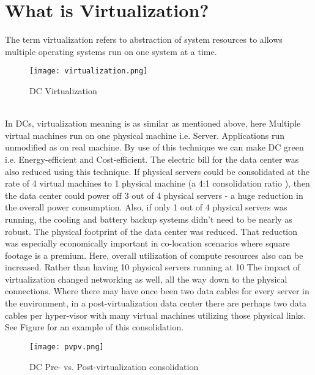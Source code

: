 \documentclass[12pt,a4paper]{report}
\begin{document}
\section{What is Virtualization?}
The term virtualization refers to abstraction of system resources to allows multiple operating systems run on one system at a time.\\
\begin{figure}[h]
\begin{center}
\texttt{[image: virtualization.png]}
\caption{DC Virtualization}
\end{center}
\end{figure}\\
In DCs, virtualization meaning is as similar as mentioned above, here Multiple virtual machines run on one physical machine i.e. Server. Applications run unmodified as on real machine. By use of this technique we can make DC green i.e. Energy-efficient and Cost-efficient. The electric bill for the data center was also reduced using this technique. If physical servers could be consolidated at the rate of 4 virtual machines to 1 physical machine (a 4:1 consolidation ratio ), then the data center could power off 3 out of 4 physical servers - a huge reduction in the overall power consumption. Also, if only 1 out of 4 physical servers was running, the cooling and battery backup systems didn't need to be nearly as robust. The physical footprint of the data center was reduced. That reduction was especially economically important in co-location scenarios where square footage is a premium. Here,  overall utilization of compute resources also can be increased. Rather than having 10 physical servers running at 10%
The impact of virtualization changed networking as well, all the way down to the physical connections. Where there may have once been two data cables for every server in the environment, in a post-virtualization data center there are perhaps two data cables per hyper-visor with many virtual machines utilizing those physical links. See Figure for an example of this consolidation.\\
\begin{figure}[h]
\begin{center}
\texttt{[image: pvpv.png]}
\caption{DC Pre- vs. Post-virtualization consolidation}
\end{center}
\end{figure}\\ 
\end{document}
